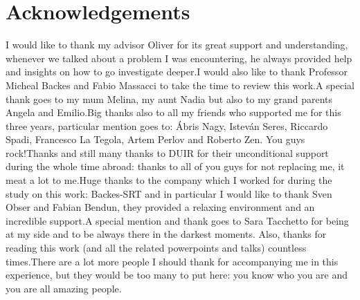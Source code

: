 \chapter*{Acknowledgements}
\thispagestyle{empty}

I would like to thank my advisor Oliver for its great support and understanding, whenever we talked about a problem I was encountering, he always provided help and insights on how to go investigate deeper.\newline I would also like to thank Professor Micheal Backes and Fabio Massacci to take the time to review this work.\newline A special thank goes to my mum Melina, my aunt Nadia but also to my grand parents Angela and Emilio.\newline Big thanks also to all my friends who supported me for this three years, particular mention goes to: \'Abris Nagy, Istev\'an Seres, Riccardo Spadi, Francesco La Tegola, Artem Perlov and Roberto Zen. You guys rock!\newline Thanks and still many thanks to DUIR for their unconditional support during the whole time abroad: thanks to all of you guys for not replacing me, it meat a lot to me.\newline Huge thanks to the company which I worked for during the study on this work: Backes-SRT and in particular I would like to thank Sven Obser and Fabian Bendun, they provided a relaxing environment and an incredible support.\newline A special mention and thank goes to Sara Tacchetto for being at my side and to be always there in the darkest moments. Also, thanks for reading this work (and all the related powerpoints and talks) countless times.\newline There are a lot more people I should thank for accompanying me in this experience, but they would be too many to put here: you know who you are and you are all amazing people.